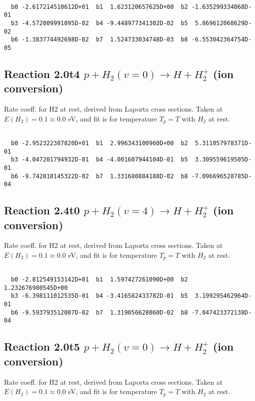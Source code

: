 \begin{small}\begin{verbatim}

  b0 -2.617214510612D+01  b1  1.623120657625D+00  b2 -1.635299334068D-01
  b3 -4.572009991095D-02  b4 -9.448977341302D-02  b5  5.869612068629D-02
  b6 -1.383774492698D-02  b7  1.524733034748D-03  b8 -6.553042364754D-05

\end{verbatim}\end{small}

\newpage
\subsection{
Reaction 2.0t4
$ p + H_2(v=0) \rightarrow H + H_2^+$ (ion conversion)
}
Rate coeff. for H2 at rest, derived from Laporta cross sections.
Taken at $E(H_2) = 0.1 \approx 0.0$ eV,  and fit is for temperature $T_p=T$ with $H_2$ at rest.

\begin{small}\begin{verbatim}

  b0 -2.952322387820D+01  b1  2.996343100960D+00  b2  5.311057978371D-01
  b3 -4.047201794932D-01  b4 -4.001607944104D-01  b5  3.309559619505D-01
  b6 -9.742818145322D-02  b7  1.331680884188D-02  b8 -7.096696528785D-04

\end{verbatim}\end{small}

\newpage
\subsection{
Reaction 2.4t0
$ p + H_2(v=4) \rightarrow H + H_2^+$ (ion conversion)
}
Rate coeff. for H2 at rest, derived from Laporta cross sections.
Taken at $E(H_2) = 0.1 \approx 0.0$ eV,  and fit is for temperature $T_p=T$ with $H_2$ at rest.

\begin{small}\begin{verbatim}

  b0 -2.812549153142D+01  b1  1.597427261090D+00  b2  1.232676980545D+00
  b3 -6.398111012535D-01  b4 -3.416582433782D-01  b5  3.199295462964D-01
  b6 -9.593793512007D-02  b7  1.319056628060D-02  b8 -7.047423372138D-04

\end{verbatim}\end{small}

\newpage
\subsection{
Reaction 2.0t5
$ p + H_2(v=0) \rightarrow H + H_2^+$ (ion conversion)
}
Rate coeff. for H2 at rest, derived from Laporta cross sections.
Taken at $E(H_2) = 0.1 \approx 0.0$ eV,  and fit is for temperature $T_p=T$ with $H_2$ at rest.

